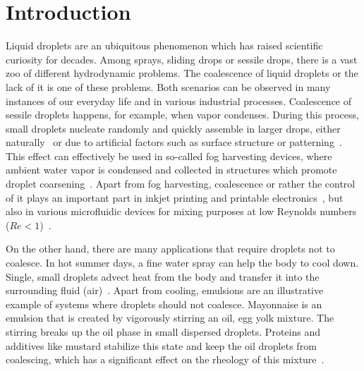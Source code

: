 \documentclass[twocolumn,amsmath,amssymb,showpacs,pre,nofootinbib,superscriptaddress]{revtex4-1} %
\begin{document}
\maketitle
 
\newcommand{\ts}{\textsuperscript}

\section{Introduction}\label{sec:intro}
Liquid droplets are an ubiquitous phenomenon which has raised scientific curiosity for decades.
Among sprays, sliding drops or sessile drops, there is a vast zoo of different hydrodynamic problems.
The coalescence of liquid droplets or the lack of it is one of these problems. 
Both scenarios can be observed in many instances of our everyday life and in various industrial processes.
Coalescence of sessile droplets happens, for example, when vapor condenses.
During this process, small droplets nucleate randomly and quickly assemble in larger drops, either naturally~\cite{PhysRevA.43.1906} or due to artificial factors such as surface structure or patterning~\cite{C1SM06219K}. 
This effect can effectively be used in so-called fog harvesting devices, where ambient water vapor is condensed and collected in structures which promote droplet coarsening~\cite{zhang2015inkjet, shi2018fog}.
Apart from fog harvesting, coalescence or rather the control of it plays an important part in inkjet printing and printable electronics~\cite{jo2009evaluation, singh2010inkjet, Kim_2005, Luechinger_2008}, but also in various microfluidic devices for mixing purposes at low Reynolds numbers ($Re < 1$)~\cite{https://doi.org/10.1002/pen.760352206, doi:10.1063/1.858199}. 

On the other hand, there are many applications that require droplets not to coalesce.
In hot summer days, a fine water spray can help the body to cool down.
Single, small droplets advect heat from the body and transfer it into the surrounding fluid (air)~\cite{kim2007spray}.
Apart from cooling, emulsions are an illustrative example of systems where droplets should not coalesce.
Mayonnaise is an emulsion that is created by vigorously stirring an oil, egg yolk mixture. 
The stirring breaks up the oil phase in small dispersed droplets.
Proteins and additives like mustard stabilize this state and keep the oil droplets from coalescing, which has a significant effect on the rheology of this mixture~\cite{harrison1985factors, DEPREE2001157}.
\end{document}
